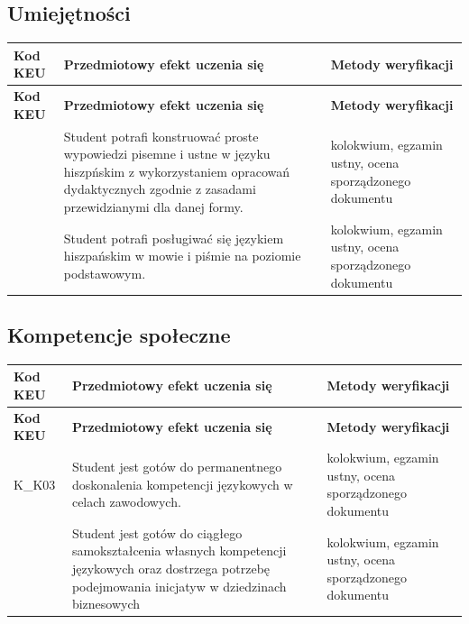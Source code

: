 \documentclass[12pt, a4paper]{article}
\newcommand{\thdrule}{\noalign{\global\setlength{\extrarowheight}{0pt}}}
\newcommand{\thdend}{\noalign{\global\setlength{\extrarowheight}{3pt}}}
\begin{document}
\subsection*{Umiejętności}
{\scriptsize
\begin{longtable}{m{1.6cm}m{9.0cm}m{4.2cm}}
\thdrule\toprule
\rowcolor{pjatkRed} {\color{white}\footnotesize\textbf{\vphantom{Ag}Kod KEU}} & {\color{white}\footnotesize\textbf{\vphantom{Ag}Przedmiotowy efekt uczenia się}} & {\color{white}\footnotesize\textbf{\vphantom{Ag}Metody weryfikacji}} \\
\midrule\thdend
\endfirsthead
\thdrule\toprule
\rowcolor{pjatkRed} {\color{white}\footnotesize\textbf{\vphantom{Ag}Kod KEU}} & {\color{white}\footnotesize\textbf{\vphantom{Ag}Przedmiotowy efekt uczenia się}} & {\color{white}\footnotesize\textbf{\vphantom{Ag}Metody weryfikacji}} \\
\midrule\thdend
\endhead
  \rowcolor{tableRowLight}  & Student potrafi konstruować proste wypowiedzi pisemne i ustne w języku hiszpńskim z wykorzystaniem opracowań dydaktycznych zgodnie z zasadami przewidzianymi dla danej formy. & kolokwium, egzamin ustny, ocena sporządzonego dokumentu \\
  \rowcolor{tableRowAlt}  & Student potrafi posługiwać się językiem hiszpańskim w mowie i piśmie na poziomie podstawowym. & kolokwium, egzamin ustny, ocena sporządzonego dokumentu \\
\bottomrule
\end{longtable}}

\subsection*{Kompetencje społeczne}
{\scriptsize
\begin{longtable}{m{1.6cm}m{9.0cm}m{4.2cm}}
\thdrule\toprule
\rowcolor{pjatkRed} {\color{white}\footnotesize\textbf{\vphantom{Ag}Kod KEU}} & {\color{white}\footnotesize\textbf{\vphantom{Ag}Przedmiotowy efekt uczenia się}} & {\color{white}\footnotesize\textbf{\vphantom{Ag}Metody weryfikacji}} \\
\midrule\thdend
\endfirsthead
\thdrule\toprule
\rowcolor{pjatkRed} {\color{white}\footnotesize\textbf{\vphantom{Ag}Kod KEU}} & {\color{white}\footnotesize\textbf{\vphantom{Ag}Przedmiotowy efekt uczenia się}} & {\color{white}\footnotesize\textbf{\vphantom{Ag}Metody weryfikacji}} \\
\midrule\thdend
\endhead
  \rowcolor{tableRowLight} K\_K03 & Student jest gotów do permanentnego doskonalenia kompetencji językowych w celach zawodowych. & kolokwium, egzamin ustny, ocena sporządzonego dokumentu \\
  \rowcolor{tableRowAlt}  & Student jest gotów do ciągłego samokształcenia własnych kompetencji językowych oraz dostrzega potrzebę podejmowania inicjatyw w dziedzinach biznesowych & kolokwium, egzamin ustny, ocena sporządzonego dokumentu \\
\bottomrule
\end{longtable}}
\end{document}
